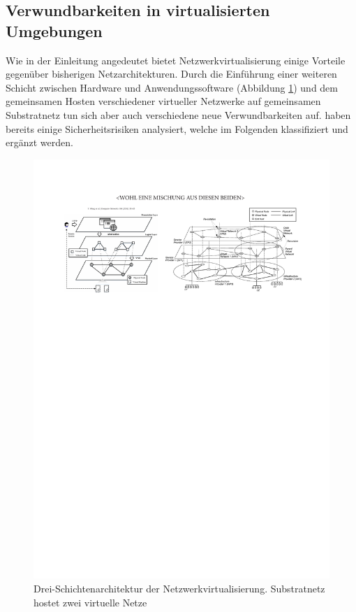 \documentclass{lni}
\begin{document}
\subsection{Verwundbarkeiten in virtualisierten Umgebungen}
\label{subsec:gefahren_virt}
Wie in der Einleitung angedeutet bietet Netzwerkvirtualisierung einige Vorteile gegenüber bisherigen Netzarchitekturen. Durch die Einführung einer weiteren Schicht zwischen Hardware und Anwendungssoftware (Abbildung \ref{fig:gefahren_dreiEbenenDerVirtualisierung}) und dem gemeinsamen Hosten verschiedener virtueller Netzwerke auf gemeinsamen Substratnetz tun sich aber auch verschiedene neue Verwundbarkeiten auf. \cite{gong2016virtual, natarajansecurity, wu2010network, garfinkel2005virtual, dahbur2011survey} haben bereits einige Sicherheitsrisiken analysiert, welche im Folgenden klassifiziert und ergänzt werden.

\begin{figure}[htb]
  \begin{center}
    \includegraphics[width=\textwidth]{gefahren_dreiEbenenDerVirtualisierung.pdf}
    \caption{\label{fig:gefahren_dreiEbenenDerVirtualisierung} Drei-Schichtenarchitektur der Netzwerkvirtualisierung. \newline Substratnetz hostet zwei virtuelle Netze}
  \end{center}
\end{figure}
\end{document}
